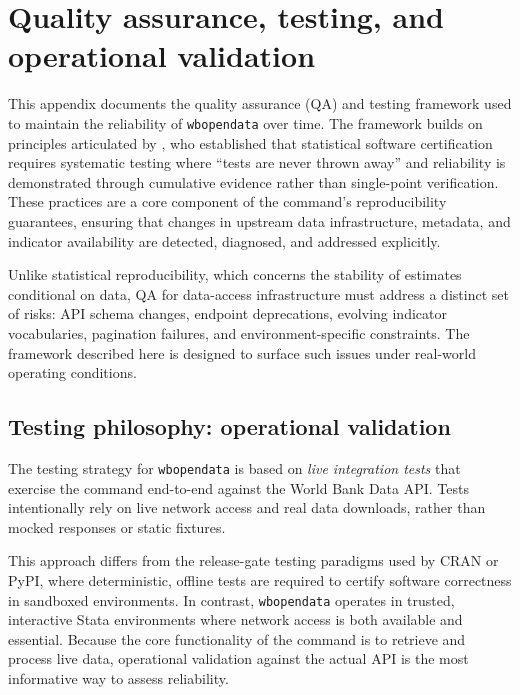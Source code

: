\documentclass[bib]{statapress}
\begin{document}
\section{Quality assurance, testing, and operational validation}\label{app:qa}

This appendix documents the quality assurance (QA) and testing framework used
to maintain the reliability of \texttt{wbopendata} over time. The framework
builds on principles articulated by \citet{gould2001certification}, who
established that statistical software certification requires systematic testing
where ``tests are never thrown away'' and reliability is demonstrated through
cumulative evidence rather than single-point verification. These practices
are a core component of the command's reproducibility guarantees, ensuring that
changes in upstream data infrastructure, metadata, and indicator availability
are detected, diagnosed, and addressed explicitly.

Unlike statistical reproducibility, which concerns the stability of estimates
conditional on data, QA for data-access infrastructure must address a distinct
set of risks: API schema changes, endpoint deprecations, evolving indicator
vocabularies, pagination failures, and environment-specific constraints. The
framework described here is designed to surface such issues under real-world
operating conditions.

\subsection{Testing philosophy: operational validation}

The testing strategy for \texttt{wbopendata} is based on \emph{live integration
tests} that exercise the command end-to-end against the World Bank Data API.
Tests intentionally rely on live network access and real data downloads, rather
than mocked responses or static fixtures.

This approach differs from the release-gate testing paradigms used by CRAN or
PyPI, where deterministic, offline tests are required to certify software
correctness in sandboxed environments. In contrast, \texttt{wbopendata} operates
in trusted, interactive Stata environments where network access is both
available and essential. Because the core functionality of the command is to
retrieve and process live data, operational validation against the actual API
is the most informative way to assess reliability.
\end{document}
